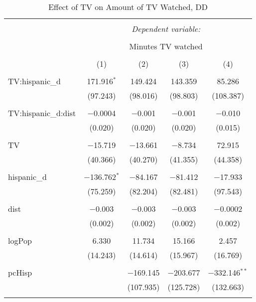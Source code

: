 
\begin{table}[!htbp] \centering 
  \caption{Effect of TV on Amount of TV Watched, DD} 
  \label{} 
\begin{tabular}{@{\extracolsep{-5pt}}lcccc} 
\\[-1.8ex]\hline 
\hline \\[-1.8ex] 
 & \multicolumn{4}{c}{\textit{Dependent variable:}} \\ 
\cline{2-5} 
\\[-1.8ex] & \multicolumn{4}{c}{Minutes TV watched} \\ 
\\[-1.8ex] & (1) & (2) & (3) & (4)\\ 
\hline \\[-1.8ex] 
 TV:hispanic\_d & 171.916$^{*}$ & 149.424 & 143.359 & 85.286 \\ 
  & (97.243) & (98.016) & (98.803) & (108.387) \\ 
  & & & & \\ 
 TV:hispanic\_d:dist & $-$0.0004 & $-$0.001 & $-$0.001 & $-$0.010 \\ 
  & (0.020) & (0.020) & (0.020) & (0.015) \\ 
  & & & & \\ 
 TV & $-$15.719 & $-$13.661 & $-$8.734 & 72.915 \\ 
  & (40.366) & (40.270) & (41.355) & (44.358) \\ 
  & & & & \\ 
 hispanic\_d & $-$136.762$^{*}$ & $-$84.167 & $-$81.412 & $-$17.933 \\ 
  & (75.259) & (82.204) & (82.481) & (97.543) \\ 
  & & & & \\ 
 dist & $-$0.003 & $-$0.003 & $-$0.003 & $-$0.0002 \\ 
  & (0.002) & (0.002) & (0.002) & (0.002) \\ 
  & & & & \\ 
 logPop & 6.330 & 11.734 & 15.166 & 2.457 \\ 
  & (14.243) & (14.614) & (15.967) & (16.769) \\ 
  & & & & \\ 
 pcHisp &  & $-$169.145 & $-$203.677 & $-$332.146$^{**}$ \\ 
  &  & (107.935) & (125.728) & (132.663) \\ 
  & & & & \\ 

\end{tabular}
\end{table}
